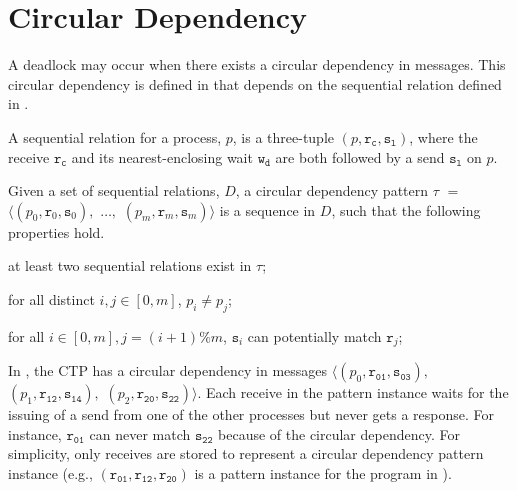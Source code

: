 \section{Circular Dependency}



A deadlock may occur when there exists a circular dependency in messages. This circular dependency is defined in  that depends on the sequential relation defined in .

\begin{definition}
A sequential relation for a process, $p$, is a three-tuple $(p, \mathtt{r_c}, \mathtt{s_l})$, where the receive $\mathtt{r_c}$ and its nearest-enclosing wait $\mathtt{w_d}$ are both followed by a send $\mathtt{s_l}$ on $p$. 
\label{def:seqrelation}
\end{definition}

\begin{definition}
Given a set of sequential relations, $D$, a circular dependency pattern $\tau$ $=$ $\langle(p_0, \mathtt{r}_0, \mathtt{s}_0),$ $\ldots,$ $(p_m, \mathtt{r}_m, \mathtt{s}_m)\rangle$ is a sequence in $D$, such that the following properties hold.
\begin{compactenum}
\item at least two sequential relations exist in $\tau$;
\item for all distinct $i,j \in [0,m]$, $p_i \neq p_j$;
\item for all $i \in [0,m], j = (i+1) \% m$, $\mathtt{s}_i$ can potentially match $\mathtt{r}_j$;
\end{compactenum}
\label{def:circular}
\end{definition}

In , the CTP has a circular dependency in messages $\langle(p_0, \mathtt{r_{01}}, \mathtt{s_{03}}),$ $(p_1, \mathtt{r_{12}}, \mathtt{s_{14}}),$ $(p_2, \mathtt{r_{20}}, \mathtt{s_{22}})\rangle$. Each receive in the pattern instance waits for the issuing of a send from one of the other processes but never gets a response. For instance, $\mathtt{r_{01}}$ can never match $\mathtt{s_{22}}$ because of the circular dependency. For simplicity, only receives are stored to represent a circular dependency pattern instance (e.g., $(\mathtt{r_{01}}, \mathtt{r_{12}}, \mathtt{r_{20}})$ is a pattern instance for the program in ). 

